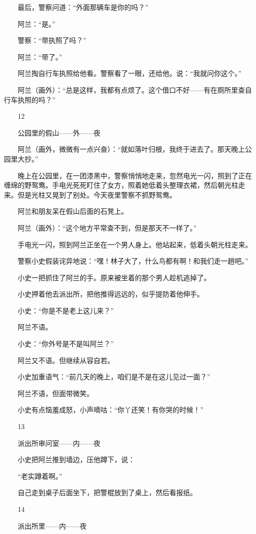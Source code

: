 　　最后，警察问道：“外面那辆车是你的吗？” 

　　阿兰：“是。” 

　　警察：“带执照了吗？” 

　　阿兰：“带了。” 

　　阿兰掏自行车执照给他看。警察看了一眼，还给他。说：“我就问你这个。” 

　　阿兰（画外）：“总是这样，我都有点烦了。这个借口不好——有在厕所里查自行车执照的吗？” 

　　12 

　　公园里的假山——外——夜 

　　阿兰（画外，微微有一点兴奋）：“就如落叶归根，我终于进去了。那天晚上公园里大抄。” 

　　晚上在公园里，在一团漆黑中，警察悄悄地走来，忽然电光一闪，照到了正在缠绵的野鸳鸯。手电光死死盯住了女方，照着她低着头整理衣裙，然后朝光柱走来。但是光柱又晃到了别处。今天夜里警察不抓野鸳鸯。 

　　阿兰和朋友呆在假山后面的石凳上。 

　　阿兰（画外）：“这个地方平常查不到，但是那天不一样了。” 

　　手电光一闪，照到阿兰正坐在一个男人身上。他站起来，低着头朝光柱走来。 

　　警察小史假装诧异地说：“嘿！林子大了，什么鸟都有啊！和我们走一趟吧。” 

　　小史一把抓住了阿兰的手。原来被坐着的那个男人趁机逃掉了。 

　　小史押着他去派出所，把他推得远远的，似乎提防着他伸手。 

　　小史：“你是不是老上这儿来？” 

　　阿兰不语。 

　　小史：“你外号是不是叫阿兰？” 

　　阿兰又不语。但继续从容自若。 

　　小史加重语气：“前几天的晚上，咱们是不是在这儿见过一面？” 

　　阿兰不语，但面带微笑。 

　　小史有点恼羞成怒，小声嘀咕：“你丫还笑！有你哭的时候！” 

　　13 

　　派出所审问室——内——夜 

　　小史把阿兰推到墙边，压他蹲下，说： 

　　“老实蹲着啊。” 

　　自己走到桌子后面坐下，把警棍放到了桌上，然后看报纸。 

　　14 

　　派出所里——内——夜 

